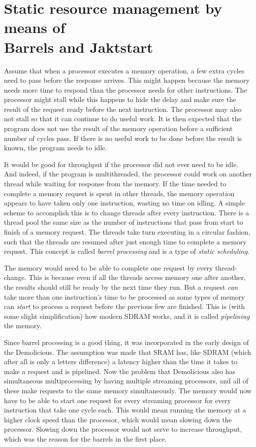 \documentclass[../main/report.tex]{subfiles}
\begin{document}
\section{Static resource management by means of\\
Barrels and Jaktstart}

Assume that when a processor executes a memory operation, a few extra cycles need to pass before the response arrives.
This might happen because the memory needs more time to respond than the processor needs for other instructions.
The processor might stall while this happens to hide the delay and make sure the result of the request ready before the next instruction.
The processor may also not stall so that it can continue to do useful work.
It is then expected that the program does not use the result of the memory operation before a sufficient number of cycles pass.
If there is no useful work to be done before the result is known, the program needs to idle.

It would be good for throughput if the processor did not ever need to be idle.
And indeed, if the program is multithreaded, the processor could work on another thread while waiting for response from the memory.
If the time needed to complete a memory request is spent in other threads, the memory operation appears to have taken only one instruction, wasting no time on idling.
A simple scheme to accomplish this is to change threads after every instruction.
There is a thread pool the same size as the number of instructions that pass from start to finish of a memory request.
The threads take turn executing in a circular fashion, such that the threads are resumed after just enough time to complete a memory request.
This concept is called \emph{barrel processing} and is a type of \emph{static scheduling}.

The memory would need to be able to complete one request by every thread-change.
This is because even if all the threads access memory one after another, the results should still be ready by the next time they run.
But a request \emph{can} take more than one instruction's time to be processed as some types of memory can \emph{start} to process a request before the previous few are finished.
This is (with some slight simplification) how modern SDRAM works, and it is called \emph{pipelining} the memory.

Since barrel processing is a good thing\texttrademark, it was incorporated in the early design of the Demolicious.
The assumption was made that SRAM has, like SDRAM (which after all is only a letters difference) a latency higher than the time it takes to make a request and is pipelined.
Now the problem that Demolicious also has simultaneous multiprocessing by having multiple streaming processors, and all of these make requests to the same memory simultaneously.
The memory would now have to be able to start one request for every streaming processor for every instruction that take one cycle each.
This would mean running the memory at a higher clock speed than the processor, which would mean slowing down the processor.
Slowing down the processor would not serve to increase throughput, which was the reason for the barrels in the first place.
\end{document}
